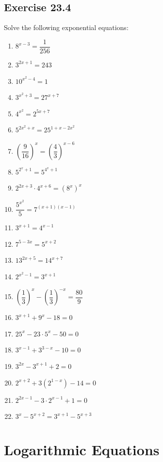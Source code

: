 \documentclass[12pt]{report}
\begin{document}
\subsection*{Exercise 23.4}

\setlength{\columnseprule}{1pt}
\setlength{\columnsep}{24pt}
\begin{multicols}{2}
    Solve the following exponential equations:

    \begin{enumerate}
        \item $8^{x-3}=\dfrac{1}{256}$
        \item $3^{2x+1}=243$
        \item $10^{x^{2}-4}=1$
        \item $3^{x^{2}+3}=27^{x+7}$
        \item $4^{x^{2}}=2^{5x+7}$
        \item $5^{2x^{2}+x}=25^{1+x-2x^{2}}$
        \item $\left({\dfrac{9}{16}}\right)^{x}=\left({\dfrac{4}{3}}\right)^{x-6}$
        \item $5^{2^x+1}=5^{4^x+1}$
        \item $2^{2x+3}\cdot4^{x+6}=\left(8^{x}\right)^{x}$
        \item ${\dfrac{5^{x^{2}}}{5}}=7^{(x+1)(x-1)}$
        \item $3^{x+1}=4^{x-1}$
        \item $7^{5-3x}=5^{x+2}$
        \item $13^{2x+5}=14^{x+7}$
        \item $2^{x^{2}-1}=3^{x+1}$
        \item $\left({\dfrac{1}{3}}\right)^{x}-\left({\dfrac{1}{3}}\right)^{-x}={\dfrac{80}{9}}$
        \item $3^{x+1}+9^{x}-18=0$
        \item $25^{x}-23\cdot5^{x}-50=0$
        \item $3^{x-1}+3^{3-x}-10=0$
        \item $3^{2x}-3^{x+1}+2=0$
        \item $2^{x+2}+3\left(2^{1-x}\right)-14=0$
        \item $2^{2x-1}-3\cdot2^{x-1}+1=0$
        \item $3^{x}-5^{x+2}=3^{x+1}-5^{x+3}$
    \end{enumerate}
\end{multicols}

\section{Logarithmic Equations}
\end{document}
